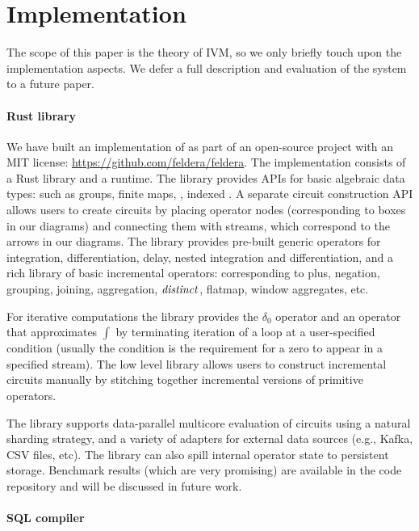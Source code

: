 \section{Implementation}\label{sec:implementation}

The scope of this paper is the \dbsp theory of IVM, so we only briefly touch upon
the implementation aspects.  We defer a full description and evaluation of the
system to a future paper.

\paragraph{\dbsp Rust library}

We have built an implementation of \dbsp as part of an
open-source project with an MIT license:
\url{https://github.com/feldera/feldera}.
The implementation consists of a Rust library and a runtime.
The library provides APIs for basic algebraic data types:
such as groups, finite maps, \zr, indexed \zr.
A separate circuit construction API allows users to
create \dbsp circuits by placing operator nodes (corresponding to boxes in our diagrams)
and connecting them with streams, which correspond to the
arrows in our diagrams.  The library provides pre-built generic operators
for integration, differentiation, delay, nested integration and differentiation,
and a rich library of \zr basic incremental operators:
corresponding to plus, negation, grouping, joining, aggregation, $\mathit{distinct}$,
flatmap, window aggregates, etc.

For iterative computations the library provides the $\delta_0$ operator and
an operator that approximates $\int$ by terminating iteration of
a loop at a user-specified condition (usually the condition is the
requirement for a zero to appear in a specified stream).
The low level library allows users to construct incremental
circuits manually by stitching together incremental versions of primitive operators.

The library supports data-parallel multicore evaluation of circuits
using a natural sharding strategy, and a variety of adapters for
external data sources (e.g., Kafka, CSV files, etc).  The library can
also spill internal operator state to persistent storage.  Benchmark
results (which are very promising) are available in the code
repository and will be discussed in future work.

\paragraph{SQL compiler}

